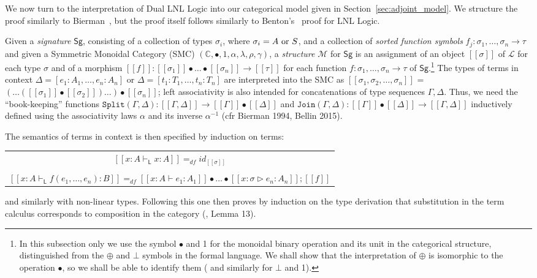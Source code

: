 We now turn to the interpretation of Dual LNL Logic into our
categorical model given in Section~\ref{sec:adjoint_model}.  We
structure the proof similarly to Bierman~\cite{Bierman:1994}, but the
proof itself follows similarly to Benton's~\cite{Benton:1994} proof
for LNL Logic.

Given a {\em signature} $\mathsf{Sg}$, consisting of a collection of types $\sigma_i$, where $\sigma_i = A\ \hbox{or}\ S$, 
and a collection of {\em sorted function symbols} $f_j : \sigma_1, \ldots, \sigma_n \rightarrow \tau$ and given 
a Symmetric Monoidal Category (SMC) $(\mathbb{C}, \bullet, 1, \alpha, \lambda, \rho, \gamma)$,  a {\em structure} 
$\mathcal{M}$ for $\mathsf{Sg}$ is an assignment of an object $[\![\sigma]\!]$ of $\mathcal{L}$ for each type $\sigma$ and of 
a morphism $[\![f]\!] : [\![\sigma_1]\!]\bullet\ldots\bullet[\![\sigma_n]\!]\rightarrow [\![\tau]\!]$ for each function
$f : \sigma_1, \ldots, \sigma_n \rightarrow \tau$ of $\mathsf{Sg}$.\footnote{ In this subsection only we use the symbol $\bullet$
  and 1 for the monoidal binary operation and its unit in the categorical structure, distinguished from the $\oplus$ and
  $\bot$ symbols in the formal language. We shall show that the interpretation of $\oplus$ is isomorphic to the operation
  $\bullet$, so we shall be able to identify them ( and similarly for $\bot$ and 1).}  The types of terms in context $\Delta = [e_1: A_1, \ldots, e_n: A_n]$ or $\Delta = [t_1: T_1, \ldots, t_n: T_n]$ are 
interpreted into the SMC as $[\![\sigma_1, \sigma_2, \ldots, \sigma_n]\!]$ =   
$(\ldots ([\![\sigma_1]\!]\bullet[\![\sigma_2]\!])\ldots ) \bullet [\![\sigma_n]\!]$; left associativity is also 
intended for concatenations of type sequences $\Gamma, \Delta$. Thus, we need the ``book-keeping'' functions 
$\mathtt{Split}(\Gamma, \Delta): [\![\Gamma, \Delta]\!] \rightarrow [\![\Gamma]\!]\bullet [\![\Delta]\!]$ and 
$\mathtt{Join}(\Gamma, \Delta): [\![\Gamma]\!] \bullet  [\![\Delta]\!] \rightarrow [\![\Gamma, \Delta]\!]$ inductively defined 
using the associativity laws $\alpha$ and its inverse $\alpha^{-1}$ (cfr Bierman 1994, Bellin 2015).  

The semantics of terms in context is then specified by induction on terms: 
\begin{center}
  \begin{tabular}{c}
    $[\![x: A\vdash_{\mathsf{L}} x: A]\!] =_{df} id_{[\![\sigma]\!]}$\\
    \\
    $[\![x: A\vdash_{\mathsf{L}}  f(e_1,\ldots, e_n): B]\!] =_{df} [\![x: A\vdash e_1: A_1]\!]\bullet
    \ldots\bullet [\![x:\sigma\triangleright e_n: A_n]\!]; [\![ f ]\!]$
  \end{tabular}
\end{center}   
and similarly with non-linear types. 
Following this one then proves by induction on the type derivation that substitution in the term calculus 
corresponds to composition in the category (\cite{Bierman:1994}, Lemma 13). 

